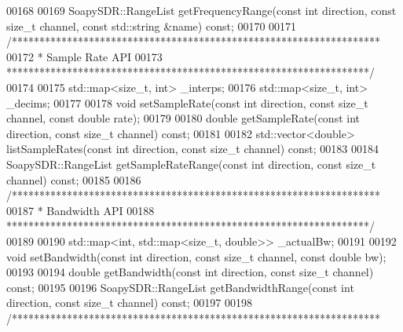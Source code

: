 \begin{DoxyCode}
00168 
00169     SoapySDR::RangeList getFrequencyRange(\textcolor{keyword}{const} \textcolor{keywordtype}{int} direction, \textcolor{keyword}{const} \textcolor{keywordtype}{size\_t} channel, \textcolor{keyword}{const} 
      std::string &name) \textcolor{keyword}{const};
00170 
00171     \textcolor{comment}{/*******************************************************************}
00172 \textcolor{comment}{     * Sample Rate API}
00173 \textcolor{comment}{     ******************************************************************/}
00174 
00175     std::map<size\_t, int> _interps;
00176     std::map<size\_t, int> _decims;
00177 
00178     \textcolor{keywordtype}{void} setSampleRate(\textcolor{keyword}{const} \textcolor{keywordtype}{int} direction, \textcolor{keyword}{const} \textcolor{keywordtype}{size\_t} channel, \textcolor{keyword}{const} \textcolor{keywordtype}{double} 
      rate);
00179 
00180     \textcolor{keywordtype}{double} getSampleRate(\textcolor{keyword}{const} \textcolor{keywordtype}{int} direction, \textcolor{keyword}{const} \textcolor{keywordtype}{size\_t} channel) \textcolor{keyword}{const};
00181 
00182     std::vector<double> listSampleRates(\textcolor{keyword}{const} \textcolor{keywordtype}{int} direction, \textcolor{keyword}{const} \textcolor{keywordtype}{size\_t} channel) \textcolor{keyword}{const};
00183 
00184     SoapySDR::RangeList getSampleRateRange(\textcolor{keyword}{const} \textcolor{keywordtype}{int} direction, \textcolor{keyword}{const} \textcolor{keywordtype}{size\_t} channel) \textcolor{keyword}{const};
00185 
00186     \textcolor{comment}{/*******************************************************************}
00187 \textcolor{comment}{     * Bandwidth API}
00188 \textcolor{comment}{     ******************************************************************/}
00189 
00190     std::map<int, std::map<size\_t, double>> _actualBw;
00191 
00192     \textcolor{keywordtype}{void} setBandwidth(\textcolor{keyword}{const} \textcolor{keywordtype}{int} direction, \textcolor{keyword}{const} \textcolor{keywordtype}{size\_t} channel, \textcolor{keyword}{const} \textcolor{keywordtype}{double} bw);
00193 
00194     \textcolor{keywordtype}{double} getBandwidth(\textcolor{keyword}{const} \textcolor{keywordtype}{int} direction, \textcolor{keyword}{const} \textcolor{keywordtype}{size\_t} channel) \textcolor{keyword}{const};
00195 
00196     SoapySDR::RangeList getBandwidthRange(\textcolor{keyword}{const} \textcolor{keywordtype}{int} direction, \textcolor{keyword}{const} \textcolor{keywordtype}{size\_t} channel) \textcolor{keyword}{const};
00197 
00198     \textcolor{comment}{/*******************************************************************}

\end{DoxyCode}
